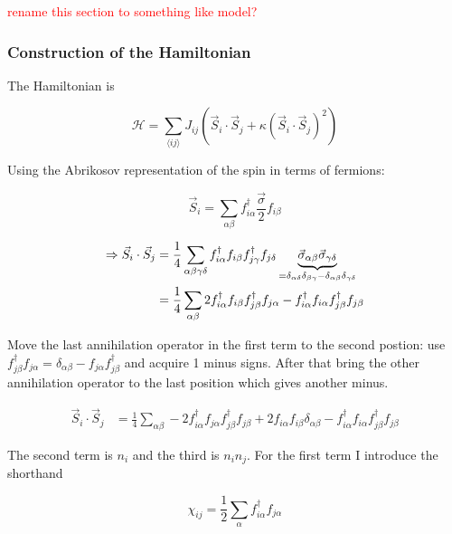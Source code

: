 \documentclass{article}
\begin{document}
\textcolor{red}{rename this section to something like model?}

\subsubsection{Construction of the Hamiltonian}

The Hamiltonian is 

\begin{equation}
	\mathcal{H} = \sum_{\langle ij \rangle} J_{ij}\left(\vec{S}_i\cdot \vec{S}_j + \kappa \left(\vec{S}_i\cdot \vec{S}_j\right)^2\right)
\end{equation}

Using the Abrikosov representation of the spin in terms of fermions:

\begin{equation}
	\vec{S}_i = \sum_{\alpha \beta} f_{i\alpha}^\dagger \frac{\vec{\sigma}}{2} f_{i\beta}
\end{equation}

\begin{align}
	\Rightarrow \vec{S}_i\cdot \vec{S}_j &= \frac14 \sum\limits_{\alpha \beta \gamma \delta} f_{i\alpha}^\dagger f_{i\beta} f_{j\gamma}^\dagger f_{j\delta} \underbrace{\vec{\sigma}_{\alpha \beta} \vec{\sigma}_{\gamma \delta}}_{= \delta_{\alpha \delta}\delta_{\beta \gamma} - \delta_{\alpha\beta}\delta_{\gamma \delta}} \notag \\
	&= \frac14 \sum\limits_{\alpha \beta} 2 f_{i\alpha}^\dagger f_{i\beta}f_{j\beta}^\dagger f_{j\alpha} - f_{i\alpha}^\dagger f_{i\alpha} f_{j\beta}^\dagger f_{j\beta} \notag 
\end{align}

Move the last annihilation operator in the first term to the second postion: use $ f_{j\beta}^\dagger f_{j\alpha} = \delta_{\alpha \beta} - f_{j\alpha}f_{j\beta}^\dagger$ and acquire 1 minus signs. After that bring the other annihilation operator to the last position which gives another minus.

\begin{align}
	\vec{S}_i\cdot \vec{S}_j &= \frac14 \sum\limits_{\alpha \beta} -2f_{i\alpha}^\dagger f_{j\alpha}f_{j\beta}^\dagger f_{j\beta} + 2 f_{i\alpha}f_{i\beta}\delta_{\alpha \beta} - f_{i\alpha}^\dagger f_{i\alpha} f_{j\beta}^\dagger f_{j\beta} 
\end{align}


The second term is $n_i$ and the third is $n_i n_j$. For the first term I introduce the shorthand

\begin{equation}
	\chi_{ij} = \frac12\sum_{\alpha} f_{i\alpha}^\dagger f_{j\alpha}
\end{equation}
\end{document}
